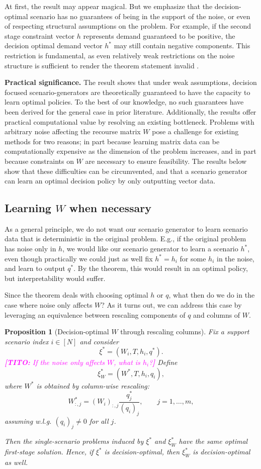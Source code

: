 \documentclass{article}
\newcommand{\thc}[1]{\textcolor{magenta}{\textbf{[TITO:} #1\textbf{]}}}
\theoremstyle{plain}
\newtheorem{proposition}{Proposition}
\theoremstyle{definition}
\theoremstyle{remark}
\begin{document}
At first, the result may appear magical. But we emphasize that the decision-optimal scenario has no guarantees of being in the support of the noise, or even of respecting structural assumptions on the problem. For example, if the second stage constraint vector $h$ represents demand guaranteed to be positive, the decision optimal demand vector $h^*$ may still contain negative components. This restriction is fundamental, as even relatively weak restrictions on the noise structure is sufficient to render the theorem statement invalid \cite{placeholder-restriction-counterexample}.

\textbf{Practical significance.}
The result shows that under weak assumptions, decision focused scenario-generators are theoretically guaranteed to have the capacity to learn optimal policies. To the best of our knowledge, no such guarantees have been derived for the general case in prior literature. Additionally, the results offer practical computational value by resolving an existing bottleneck. Problems with arbitrary noise affecting the recourse matrix $W$ pose a challenge for existing methods for two reasons; in part because learning matrix data can be computationally expensive as the dimension of the problem increases, and in part because constraints on $W$ are necessary to ensure feasibility. The results below show that these difficulties can be circumvented, and that a scenario generator can learn an optimal decision policy by only outputting vector data.

\subsection{Learning $W$ when necessary}
As a general principle, we do not want our scenario generator to learn scenario data that is deterministic in the original problem. E.g., if the original problem has noise only in $h$, we would like our scenario generator to learn a scenario $h^*$, even though practically we could just as well fix $h^*=h_i$ for some $h_i$ in the noise, and learn to output $q^*$. By the theorem, this would result in an optimal policy, but interpretability would suffer.

Since the theorem deals with choosing optimal $h$ or $q$, what then do we do in the case where noise only affects $W$? As it turns out, we can address this case by leveraging an equivalence between rescaling components of $q$ and columns of $W$.

\begin{proposition}[Decision-optimal $W$ through rescaling columns]
\label{prop:rescaling-W}
Fix a support scenario index $i\in[N]$ and consider
\[
\xi^*=(W_i,T,h_i,q^*).
\]
\thc{If the noise only affects $W$, what is $h_i$?}
Define
\[
\xi_W^*=(W^*,T,h_i,q_i),
\]
where $W^*$ is obtained by column-wise rescaling:
\[
W^*_{:,j}=(W_i)_{:,j}\frac{q^*_j}{(q_i)_j},\qquad j=1,\ldots,m,
\]
assuming w.l.g. $(q_i)_j\neq 0$ for all $j$.

Then the single-scenario problems induced by $\xi^*$ and $\xi_W^*$ have the same optimal first-stage solution. Hence, if $\xi^*$ is decision-optimal, then $\xi_W^*$ is decision-optimal as well.
\end{proposition}
\end{document}
